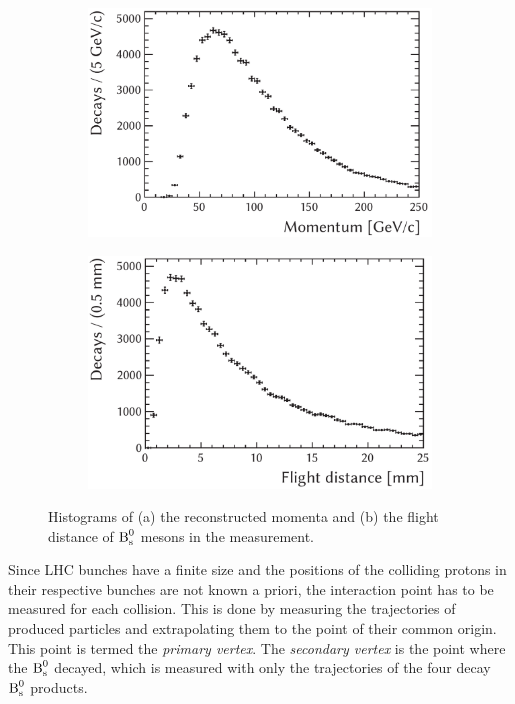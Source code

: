 \begin{figure}[tbhp]
  \centering
  \begin{subfigure}{0.497\textwidth}
    \includegraphics[width=\textwidth]{graphics/intro/BMomentum}
    \caption{}
    \label{fig:introHists_BMomentum}
  \end{subfigure}%
  \hfill%
  \begin{subfigure}{0.497\textwidth}
    \includegraphics[width=\textwidth]{graphics/intro/flightDist}
    \caption{}
    \label{fig:introHists_flightDist}
  \end{subfigure}
  \caption{Histograms of (a) the reconstructed momenta and (b) the flight distance of $\text{B}_\text{s}^\text{0}$ mesons in the \BstoJpsiKK{} measurement.}
  \label{fig:introHists}
\end{figure}

Since LHC bunches have a finite size and the positions of the colliding protons in their respective bunches are not known a priori, the
interaction point has to be measured for each collision. This is done by measuring the trajectories of produced particles and extrapolating
them to the point of their common origin. This point is termed the \emph{primary vertex}. The \emph{secondary vertex} is the point where
the $\text{B}_\text{s}^\text{0}$ decayed, which is measured with only the trajectories of the four decay $\text{B}_\text{s}^\text{0}$ products.

